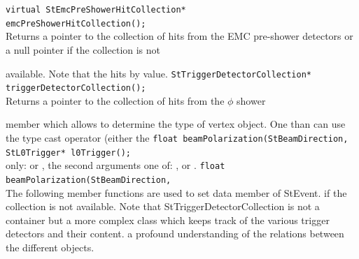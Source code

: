     \verb+virtual StEmcPreShowerHitCollection*+\\
    \verb+emcPreShowerHitCollection();+\\
    Returns a pointer to the collection of hits from the EMC
    pre-shower detectors or a null pointer if the collection is not
    
    available.  Note that  the
     
    hits by value.
    \verb+StTriggerDetectorCollection* triggerDetectorCollection();+\\
    Returns a pointer to the collection of hits from the $\phi$ shower
   
    member  which allows to determine the type of vertex
    object. One than can use the type cast operator (either the
    \verb+float beamPolarization(StBeamDirection,+\\
    \verb+StL0Trigger* l0Trigger();+\\
    
      
    only:  or ,  the second arguments one of:
    ,  or .
    \verb+float beamPolarization(StBeamDirection,+\\ 
    The following member functions are used to set data member of StEvent.
    if the collection is not available. Note that StTriggerDetectorCollection
    is not a container but a more complex class which keeps track of the
    various trigger detectors and their content.
    a profound understanding of the relations between the different objects.    
    
